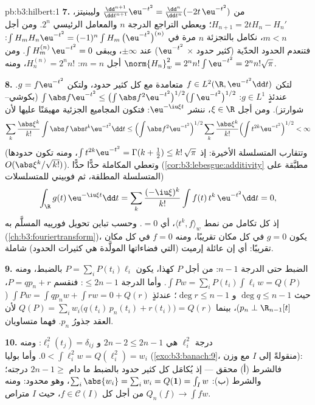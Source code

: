 \begin{solution}{pb:b3:hilbert:1}
\textbf{7.} من $\frac{\dd^{n+1}}{\dd t^{n+1}}\eu^{-t^2} =
\frac{\dd^n}{\dd t^n}(-2t\,\eu^{-t^2})$ وليبنيتز، $H_{n+1}
= 2tH_n - H_n'$؛ ويعطي التراجع الدرجة
$n$ والمعامل الرئيسي $2^n$. ومن أجل $m < n$، نكامل بالتجزئة
$n$ مرة في $\int H_m H_n\eu^{-t^2} = (-1)^n\int H_m\,\bigl(\eu^{-t^2}
\bigr)^{(n)}$: فتنعدم الحدود الحدّية (كثير حدود $\times$
$\eu^{-t^2}$) عند $\pm\infty$، ويبقى $\int
H_m^{(n)}\,\eu^{-t^2} = 0$. ومن أجل $m = n$:
$H_n^{(n)} = 2^nn!$، ومنه $\norm{H_n}_w^2 = 2^nn!\int\eu^{-t^2} = 2^nn!\sqrt\pi$.

\textbf{8.} لتكن $f \in L^2(\R, \eu^{-t^2}\dd t)$ متعامدة مع كل كثير حدود، ولتكن $g = f\eu^{-t^2}$.
عندئذٍ $g \in
L^1$: $\int\abs f\eu^{-t^2} \leq \bigl(\int\abs
f^2\eu^{-t^2}\bigr)^{1/2}\bigl(\int\eu^{-t^2}\bigr)^{1/2}$ (بكوشي--شوارتز). ومن أجل $\xi \in \R$،
ننشر $\eu^{-\iu\xi t}$: فتكون المجاميع الجزئية مهيمَنًا عليها لأن
\[
\sum_k\frac{\abs\xi^k}{k!}\int\abs f\,\abs t^k\eu^{-t^2}\dd t
\leq \Bigl(\int \abs f^2\eu^{-t^2}\Bigr)^{1/2}
\sum_k\frac{\abs\xi^k}{k!}\Bigl(\int
t^{2k}\eu^{-t^2}\Bigr)^{1/2} < \infty
\]
(وتتقارب المتسلسلة الأخيرة: إذ $\int t^{2k}\eu^{-t^2} =
\Gamma(k+\frac12) \leq k!\,\sqrt\pi$، ومنه تكون حدودها
$O(\abs\xi^k/\sqrt{k!})$). وتعطي المكاملة حدًّا حدًّا (\cref{cor:b3:lebesgue:additivity} مطبَّقة على
المتسلسلة المطلقة، ثم فوبيني للمتسلسلات)
\[
\int_\R g(t)\,\eu^{-\iu\xi t}\dd t
= \sum_k\frac{(-\iu\xi)^k}{k!}\int f(t)\,t^k\,\eu^{-t^2}\dd t
= 0 ,
\]
إذ كل تكامل من نمط $\langle t^k, f\rangle_w$، أي $= 0$. وحسب تباين تحويل فورييه
المسلَّم به (\cref{ch:b3:fouriertransform})، يكون $g = 0$ في كل مكان تقريبًا، ومنه
$f = 0$ في كل مكان تقريبًا: أي إن عائلة إرميت (التي فضاءاتها
المولَّدة هي كثيرات الحدود) شاملة.

\textbf{9.} الضبط حتى الدرجة $n - 1$: من أجل $P$ كهذا، يكون
$P =
\sum_iP(t_i)\ell_i$ بالضبط، ومنه $\int Pw = \sum_iP(t_i)\int
\ell_iw = Q(P)$. وأما الدرجة $\leq 2n - 1$:
فنقسم $P = qp_n + r$، حيث $\deg q \leq n - 1$ و $\deg r \leq n-1$؛ عندئذٍ $\int Pw = \int
qp_nw + \int rw = 0 + Q(r)$
($p_n \perp \R_{n-1}[t]$)، بينما
$Q(P) = \sum_iw_i\bigl(q(t_i)\,p_n(t_i) + r(t_i)\bigr) = Q(r)$
لأن العقد جذورُ $p_n$. فهما متساويان.

\textbf{10.} درجة $\ell_i^2$ هي $2n - 2 \leq 2n - 1$ و $\ell_i^2(t_j) = \delta_{ij}$: ومنه $0 < \int\ell_i^2w = Q(\ell_i^2)
= w_i$.
وأما بوليا (\cref{exo:b3:banach:9}، منقولةً إلى $I$ مع وزن): فالشرط (أ)
محقق --- إذ يُكامَل كل كثير حدود بالضبط ما دام
$2n - 1 \geq$ درجته؛ والشرط (ب): $\sum_i\abs{w_{i}} = \sum_iw_i = Q(\mathbf 1) = \int_Iw$، وهو محدود: ومنه
$Q_n(f) \to \int fw$ من أجل كل $f \in \mathcal C(I)$، حيث $I$ متراص.


\end{solution}
